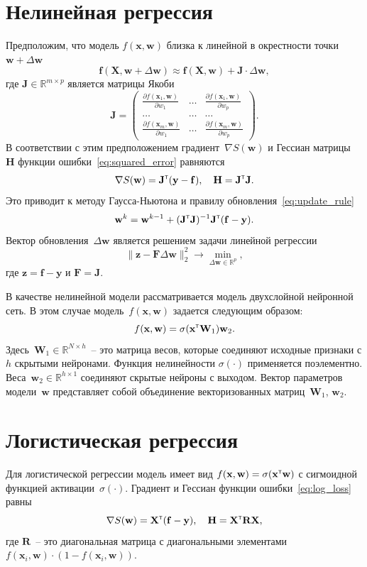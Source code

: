 \documentclass[a4paper,12pt]{article}
\theoremstyle{plain} %
\theoremstyle{definition} %
\theoremstyle{remark} %
\newcommand{\bw}{\mathbf{w}}
\newcommand{\by}{\mathbf{y}}
\newcommand{\bx}{\mathbf{x}}
\newcommand{\bz}{\mathbf{z}}
\newcommand{\bJ}{\mathbf{J}}
\newcommand{\bbR}{\mathbb{R}}
\newcommand{\bW}{\mathbf{W}}
\newcommand{\bH}{\mathbf{H}}
\newcommand{\bF}{\mathbf{F}}
\newcommand{\bR}{\mathbf{R}}
\newcommand{\bX}{\mathbf{X}}
\newcommand{\T}{{\text{\tiny\sffamily\upshape\mdseries T}}}
\begin{document}
	\section*{Нелинейная регрессия}
	Предположим, что модель $f (\bx , \bw)$ близка к линейной в окрестности точки $\bw + \Delta \bw$
	\[
	\mathbf{f}(\bX , \bw + \Delta \bw) \approx \mathbf{f}(\bX , \bw) + \bJ \cdot \Delta  \bw,
	\]
	где $\mathbf{J} \in \bbR^{m \times p}$ является матрицы Якоби
	\begin{equation}
	\bJ = 
	\begin{pmatrix}
	\frac{\partial f(\bx_1 , \bw)}{\partial w_1} & \dots & 
	\frac{\partial f(\bx_1 , \bw)}{\partial w_p} \\
	\dots & \dots & \dots \\
	\frac{\partial f(\bx_m , \bw)}{\partial w_1} & \dots & 
	\frac{\partial f(\bx_m , \bw)}{\partial w_p}
	\end{pmatrix}.
	\end{equation}
	В соответствии с этим предположением градиент~$\nabla S(\bw)$ и Гессиан матрицы~$\bH$ функции ошибки~\eqref{eq:squared_error} равняются
	\begin{equation}
	\nabla S(\bw) = \bJ^{\T} (\by - \mathbf{f}), \quad \bH = \bJ^{\T} \bJ.
	\label{eq:nonlin_reg_deriv}
	\end{equation}
	Это приводит к методу Гаусса-Ньютона и правилу обновления~\eqref{eq:update_rule}
	\[
	\bw^k = \bw^{k - 1} + (\bJ^{\T} \bJ)^{-1}\bJ^{\T}(\mathbf{f} - \by).
	\]
	Вектор обновления~$\Delta \bw$ является решением задачи линейной регрессии
	\begin{equation}
	\| \bz - \bF \Delta \bw \|_2^2 \rightarrow \min_{\Delta \bw \in \bbR^{p}},
	\label{eq:lin_reg_nonlin_reg}
	\end{equation}
	где $\bz = \mathbf{f} - \by$ и $\bF = \bJ$.
	
	В качестве нелинейной модели рассматривается модель двухслойной нейронной сеть. В этом случае модель~$f (\bx, \bw)$ задается
	следующим образом:
	\[
	f(\bx, \bw) = \sigma(\bx^{\T} \bW_1) \bw_2.
	\]
	Здесь~$\bW_1 \in \bbR^{N \times h}$~-- это матрица весов, которые соединяют исходные признаки с $h$ скрытыми нейронами. Функция нелинейности $\sigma(\cdot)$ применяется поэлементно. Веса~$\bw_2 \in \bbR^{h \times 1}$ соединяют скрытые нейроны с выходом. 
	Вектор параметров модели~$\bw$ представляет собой объединение векторизованных матриц~$\bW_1$, $\bw_2$.

	\section*{Логистическая регрессия}
	Для логистической регрессии модель имеет вид $f(\bx , \bw) = \sigma(\bx^{\T} \bw)$ с сигмоидной функцией активации~$\sigma(\cdot)$.
	Градиент и Гессиан функции ошибки~\eqref{eq:log_loss} равны
	\begin{equation}
	\nabla S(\bw) = \bX^{\T} (\mathbf{f} - \by), \quad \bH = \bX^{\T} \bR \bX,
	\label{eq:log_reg_deriv}
	\end{equation}
	где $\bR$~-- это диагональная матрица с диагональными элементами $f(\bx_i , \bw) \cdot (1 - f(\bx_i , \bw))$.
	
\end{document}
